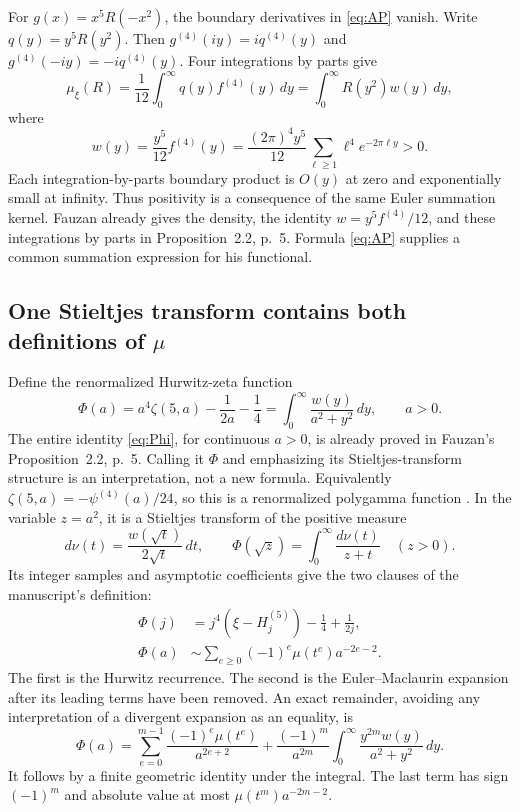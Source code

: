 \documentclass[11pt]{article}
\theoremstyle{definition}
\theoremstyle{remark}\newtheorem*{remark}{Remark}
\newcommand{\dd}{\,d}
\begin{document}
For $g(x)=x^5R(-x^2)$, the boundary derivatives in \eqref{eq:AP} vanish.
Write $q(y)=y^5R(y^2)$. Then $g^{(4)}(iy)=iq^{(4)}(y)$ and
$g^{(4)}(-iy)=-iq^{(4)}(y)$. Four integrations by parts give
\begin{equation}\label{eq:positive}
 \mu_\xi(R)=\frac1{12}\int_0^\infty q(y)f^{(4)}(y)\dd y
 =\int_0^\infty R(y^2)w(y)\dd y,
\end{equation}
where
\begin{equation}\label{eq:weight}
 w(y)=\frac{y^5}{12}f^{(4)}(y)
 =\frac{(2\pi)^4y^5}{12}\sum_{\ell\ge1}\ell^4e^{-2\pi\ell y}>0.
\end{equation}
Each integration-by-parts boundary product is $O(y)$ at zero and exponentially
small at infinity. Thus positivity is a consequence of the same Euler summation
kernel. Fauzan already gives the density, the identity $w=y^5f^{(4)}/12$,
and these integrations by parts in Proposition~2.2, p.~5. Formula
\eqref{eq:AP} supplies a common summation expression for his functional.

\subsection{One Stieltjes transform contains both definitions of \texorpdfstring{$\mu$}{mu}}
Define the renormalized Hurwitz-zeta function
\begin{equation}\label{eq:Phi}
 \Phi(a)=a^4\zeta(5,a)-\frac1{2a}-\frac14
       =\int_0^\infty\frac{w(y)}{a^2+y^2}\dd y,
 \qquad a>0.
\end{equation}
The entire identity \eqref{eq:Phi}, for continuous $a>0$, is already proved
in Fauzan's Proposition~2.2, p.~5. Calling it $\Phi$ and emphasizing its
Stieltjes-transform structure is an interpretation, not a new formula.
Equivalently $\zeta(5,a)=-\psi^{(4)}(a)/24$, so this is a renormalized
polygamma function \cite{Polygamma}. In the variable $z=a^2$, it is a Stieltjes
transform of the positive measure
\[
 d\nu(t)=\frac{w(\sqrt t)}{2\sqrt t}\dd t,\qquad
 \Phi(\sqrt z)=\int_0^\infty\frac{d\nu(t)}{z+t}\quad(z>0).
\]
Its integer samples and asymptotic coefficients give the two clauses of the
manuscript's definition:
\begin{align}
 \Phi(j)&=j^4(\xi-H_j^{(5)})-\frac14+\frac1{2j},\label{eq:samples}\\
 \Phi(a)&\sim\sum_{e\ge0}(-1)^e\mu(t^e)a^{-2e-2}.
 \label{eq:PhiAsymp}
\end{align}
The first is the Hurwitz recurrence. The second is the Euler--Maclaurin expansion
after its leading terms have been removed. An exact remainder, avoiding any
interpretation of a divergent expansion as an equality, is
\begin{equation}\label{eq:remainder}
 \Phi(a)=\sum_{e=0}^{m-1}\frac{(-1)^e\mu(t^e)}{a^{2e+2}}
 +\frac{(-1)^m}{a^{2m}}\int_0^\infty
       \frac{y^{2m}w(y)}{a^2+y^2}\dd y.
\end{equation}
It follows by a finite geometric identity under the integral. The last term has
sign $(-1)^m$ and absolute value at most $\mu(t^m)a^{-2m-2}$.
\end{document}
